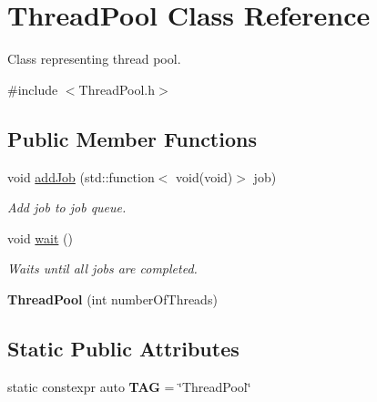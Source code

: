 \hypertarget{classThreadPool}{\section{Thread\-Pool Class Reference}
\label{classThreadPool}
}


Class representing thread pool.  




{\ttfamily \#include $<$Thread\-Pool.\-h$>$}

\subsection*{Public Member Functions}
\begin{DoxyCompactItemize}
\item 
void \hyperlink{classThreadPool_a24a2e7844d83f452eac701ad8484593c}{add\-Job} (std\-::function$<$ void(void)$>$ job)
\begin{DoxyCompactList}\small\item\em Add job to job queue. \end{DoxyCompactList}\item 
\hypertarget{classThreadPool_a41dde4c256785b525a0334c060932a64}{void \hyperlink{classThreadPool_a41dde4c256785b525a0334c060932a64}{wait} ()}\label{classThreadPool_a41dde4c256785b525a0334c060932a64}

\begin{DoxyCompactList}\small\item\em Waits until all jobs are completed. \end{DoxyCompactList}\item 
\hypertarget{classThreadPool_af59341f9ab24fda771109bc3ee8cdef2}{{\bfseries Thread\-Pool} (int number\-Of\-Threads)}\label{classThreadPool_af59341f9ab24fda771109bc3ee8cdef2}

\end{DoxyCompactItemize}
\subsection*{Static Public Attributes}
\begin{DoxyCompactItemize}
\item 
\hypertarget{classThreadPool_a0966794dbb8ee4bf35d96e74ca22b3e7}{static constexpr auto {\bfseries T\-A\-G} = \char`\"{}Thread\-Pool\char`\"{}}\label{classThreadPool_a0966794dbb8ee4bf35d96e74ca22b3e7}

\end{DoxyCompactItemize}


